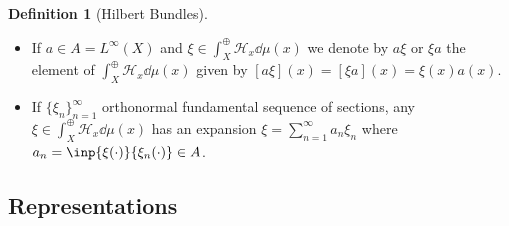\documentclass[12pt,letterpaper]{article}
\renewcommand{\H}{\mathcal{H}}
\theoremstyle{definition}
\newtheorem{definition}{Definition}[]
\theoremstyle{plain}
\theoremstyle{remark}
\begin{document}
\begin{definition}[Hilbert Bundles]
\begin{itemize}
\[            \]
        is a Hilbert space with inner product $ \inp{\xi}{\eta} = \int_{X}\inp{\xi(x)}{\eta(x)}\dd{\mu(x)} $.
        \item If $ a\in A = L^{\infty}(X) $ and $ \xi\in\int_{X}^{\oplus}\H_{x}\dd{\mu(x)} $ we denote by $ a \xi $ or $ \xi a $ the element of $ \int_{X}^{\oplus}\H_{x}\dd{\mu(x)} $ given by $ [a \xi](x) = [\xi a](x) = \xi(x)a(x) $.
        \item If $ \{\xi_{n}\}_{n=1}^{\infty} $ orthonormal fundamental sequence of sections, any $ \xi\in\int_{X}^{\oplus}\H_{x}\dd{\mu(x)} $ has an expansion $ \xi = \sum_{n=1}^{\infty}a_{n} \xi_{n} $ where $ a_{n} = \inp{\xi(\cdot)}{\xi_{n}(\cdot)}\in A $.
    \end{itemize}
\end{definition}

\subsection{Representations}
\end{document}
